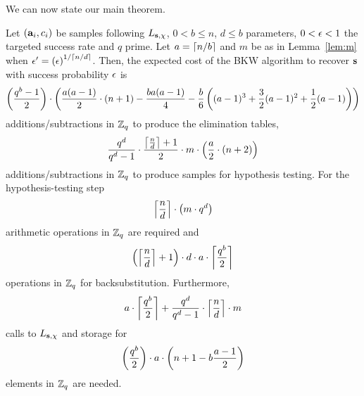 We can now state our main theorem.
\begin{theorem}\label{theorem:complexity1}
Let $(\mathbf{a}_i,c_i)$ be samples following $L_{\mathbf{s},\chi}$, $0 < b \leq n$, $d \leq b$ parameters, $0 < \epsilon < 1$ the targeted success rate and $q$ prime. Let $a = \lceil n/b \rceil$ and $m$ be as in Lemma~\ref{lem:m} when $\epsilon' = \left(\epsilon\right)^{1/\lceil n/d\rceil}$. Then, the expected cost of the BKW algorithm to recover $\mathbf{s}$ with success probability $\epsilon$ is
\begin{equation}\label{eq:theorem:complexity1:tables}\left(\frac{q^b-1}{2}\right)\cdot \left( \frac{a(a-1)}{2}\cdot (n+1) - \frac{ba(a-1)}{4}-\frac{b}{6}\left((a-1)^3+\frac{3}{2}(a-1)^2+\frac{1}{2}(a-1)\right) \right)\end{equation}
additions/subtractions in $\mathbb{Z}_q$ to produce the elimination tables,
\begin{equation}\label{eq:theorem:complexity1:samples}\frac{q^d}{q^d-1} \cdot \frac{\left\lceil\frac{n}{d}\right\rceil +1}{2} \cdot m\cdot\left(\frac{a}{2}\cdot(n+2)\right)\end{equation}
additions/subtractions in $\mathbb{Z}_q$ to produce samples for hypothesis testing.
For the hypothesis-testing step 
\begin{equation}\label{eq:theorem:complexity1:hypothesis}\left\lceil\frac{n}{d}\right\rceil \cdot  \left({m \cdot q^d} \right)\end{equation}
arithmetic operations in $\mathbb{Z}_q$ are required and 
\begin{equation}\label{eq:theorem:complexity1:backsubstitution}\left(\left\lceil\frac{n}{d}\right\rceil +1\right) \cdot d \cdot a \cdot \left\lceil\frac{q^b}{2}\right\rceil\end{equation}
operations in $\mathbb{Z}_q$ for backsubstitution.
Furthermore,
\begin{equation}\label{eq:theorem:complexity1:calls}a\cdot \left\lceil \frac{q^b}{2}\right\rceil + \frac{q^d}{q^d-1} \cdot \left\lceil\frac{n}{d}\right\rceil \cdot m \end{equation}
calls to $L_{\mathbf{s},\chi}$ and storage for
\begin{equation}\label{eq:theorem:complexity1:store}\left( \frac{q^b}{2} \right) \cdot a\cdot \left(n+1 - b\frac{a-1}{2}\right)\end{equation}
elements in $\mathbb{Z}_q$ are needed.
\end{theorem}

